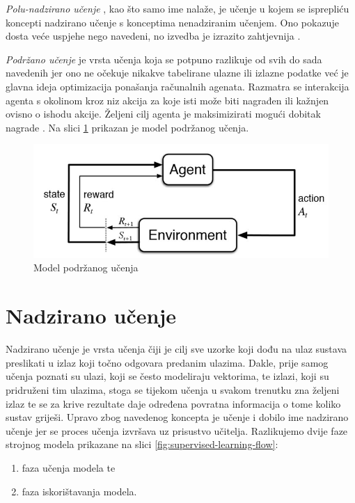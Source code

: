 \documentclass[times, utf8, zavrsni]{fer}
\begin{document}
\bigskip

\textit{Polu-nadzirano učenje} , kao što samo ime nalaže, je učenje u kojem se isprepliću koncepti nadzirano učenje s konceptima nenadziranim učenjem. Ono pokazuje dosta veće uspjehe nego navedeni, no izvedba je izrazito zahtjevnija \citep{wiki:SEMISUP}.

\bigskip

\textit{Podržano učenje}  je vrsta učenja koja se potpuno razlikuje od svih do sada navedenih jer ono ne očekuje nikakve tabelirane ulazne ili izlazne podatke već je glavna ideja optimizacija ponašanja računalnih agenata. Razmatra se interakcija agenta s okolinom  kroz niz akcija za koje isti može biti nagrađen ili kažnjen ovisno o ishodu akcije. Željeni cilj agenta je maksimizirati mogući dobitak nagrade \citep{wiki:RL}. Na slici \ref{fig:reinforcement-learning} prikazan je model podržanog učenja.

\begin{figure}[H]
    \centering
    \includegraphics[scale=0.7]{img/reinforcement-learning.jpg}
    \caption[Caption for LOF]{Model podržanog učenja\footnotemark}
    \label{fig:reinforcement-learning}
\end{figure}

\chapter{Nadzirano učenje}
Nadzirano učenje  je vrsta učenja čiji je cilj sve uzorke koji dođu na ulaz sustava preslikati u izlaz koji točno odgovara predanim ulazima. Dakle, prije samog učenja poznati su ulazi, koji se često modeliraju vektorima, te izlazi, koji su pridruženi tim ulazima, stoga se tijekom učenja u svakom trenutku zna željeni izlaz te se za krive rezultate daje određena povratna informacija  o tome koliko sustav griješi. Upravo zbog navedenog koncepta je učenje i dobilo ime nadzirano učenje jer se proces učenja izvršava uz prisustvo učitelja. Razlikujemo dvije faze strojnog modela prikazane na slici \ref{fig:supervised-learning-flow}:
\begin{enumerate}
    \item faza učenja modela te
    \item faza iskorištavanja modela.
\end{enumerate}
\end{document}

